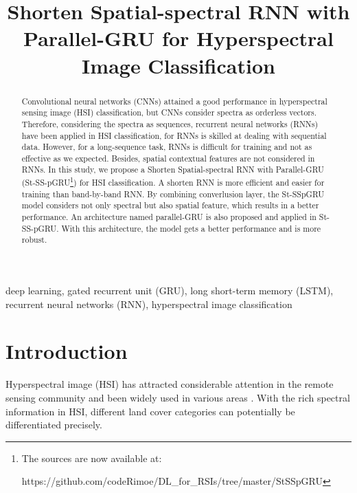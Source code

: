 \documentclass[conference]{IEEEtran}
\begin{document}
\title{Shorten Spatial-spectral RNN with Parallel-GRU for Hyperspectral Image Classification\\
{\footnotesize}
}

\author{
}

\maketitle

\begin{abstract}
    Convolutional neural networks (CNNs) attained a good performance in hyperspectral
    sensing image (HSI) classification, but CNNs consider spectra as orderless vectors.
    Therefore, considering the spectra as sequences, recurrent neural networks (RNNs)
    have been applied in HSI classification, for RNNs is skilled at dealing with
    sequential data. However, for a long-sequence task, RNNs is difficult for training
    and not as effective as we expected. Besides, spatial contextual features are not
    considered in RNNs. In this study, we propose a Shorten Spatial-spectral RNN with
    Parallel-GRU (St-SS-pGRU\footnote{The sources are now available at: 
    
    https://github.com/codeRimoe/DL\_for\_RSIs/tree/master/StSSpGRU})  for HSI classification.
    A shorten RNN is more efficient and easier for training than band-by-band RNN.
    By combining converlusion layer, the St-SSpGRU model considers not only spectral
    but also spatial feature, which results in a better performance. An architecture
    named parallel-GRU is also proposed and applied in St-SS-pGRU. With this architecture,
    the model gets a better performance and is more robust.         
\end{abstract}

\begin{IEEEkeywords}
 deep learning,
 gated recurrent unit (GRU),
 long short-term memory (LSTM),
 recurrent neural networks (RNN),
 hyperspectral image classification
\end{IEEEkeywords}

\section{Introduction}
Hyperspectral image (HSI) has attracted considerable attention in the remote sensing
community and been widely used in various areas \cite{bioucas2013hyperspectral}. With
the rich spectral information in HSI, different land cover categories can potentially
be differentiated precisely.
\end{document}

